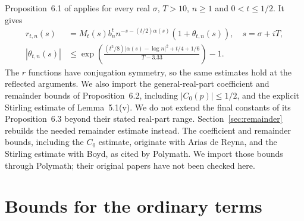 \documentclass[11pt]{article}
\theoremstyle{remark}
\newcommand{\abs}[1]{\left\lvert#1\right\rvert}
\numberwithin{equation}{section}
\begin{document}
Proposition~6.1 of \cite{polymath} applies for every real $\sigma$,
$T>10$, $n\ge1$ and $0<t\le1/2$. It gives
\begin{align}
 r_{t,n}(s)&=M_t(s)b_n^t n^{-s-(t/2)\alpha(s)}(1+\theta_{t,n}(s)),
 \quad s=\sigma+iT,\label{eq:r-approx}\\
 \abs{\theta_{t,n}(s)}&\le
 \exp\left(\frac{(t^2/8)|\alpha(s)-\log n|^2+t/4+1/6}{T-3.33}\right)-1.
 \label{eq:r-error}
\end{align}
The $r$ functions have conjugation symmetry, so the same estimates hold
at the reflected arguments. We also import the general-real-part
coefficient and remainder bounds of Proposition~6.2, including
$|C_0(p)|\le1/2$, and the explicit Stirling estimate of Lemma~5.1(v).
We do not extend the final constants of its Proposition~6.3 beyond
their stated real-part range. Section~\ref{sec:remainder} rebuilds the
needed remainder estimate instead. The coefficient and remainder bounds,
including the $C_0$ estimate, originate with Arias de Reyna, and the
Stirling estimate with Boyd, as cited by Polymath. We import those bounds
through Polymath; their original papers have not been checked here.

\section{Bounds for the ordinary terms}\label{sec:ordinary}
\end{document}
